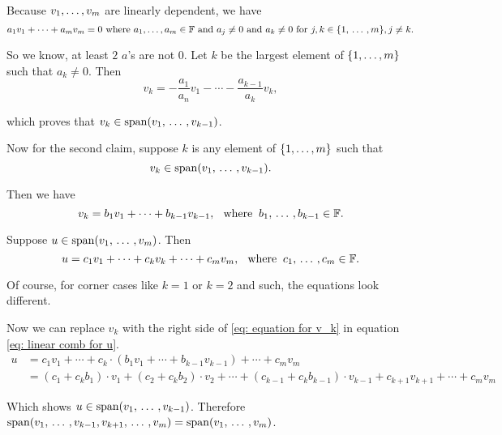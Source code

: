 \begin{prf}
  Because $v_1, \dots, v_m$ are linearly dependent, we have
  \begin{equation}
    a_1 v_1 + \cdots + a_m v_m = 0
    $ where $a_1, \ldots, a_m \in \myF$ and $a_j \neq 0$ and $a_k \neq 0 $ for $j,k \in \{1, \ddd, m\}, j \neq k.
  \end{equation}

  So we know, at least $2$ $a$'s are not $0$.
  Let $k$ be the largest element of $\{ 1, \ldots, m \}$ such that $a_k \neq 0$. Then
  \begin{equation}
    v_k = - \frac{a_1}{a_n}v_1 - \cdots - \frac{a_{k-1}}{a_k}v_k,
  \end{equation}

  which proves that $v_k \in \operatorname{span} (v_1, {\, \ldots \,\,}, v_{k-1})$.

  Now for the second claim, suppose $k$ is any element of $\{ 1, \ldots, m \}$ such that
  \begin{equation}
    v_k \in \operatorname{span} (v_1, {\, \ldots \,\,}, v_{k-1}).
  \end{equation}

  Then we have
  \begin{equation}
    \label{eq: equation for v_k}
    v_k = b_1v_1 + \cdots + b_{k-1}v_{k-1}, \;\;\, \text{where}\;\; b_1, {\, \ldots \,\,}, b_{k-1} \in \mathbb{F}.
  \end{equation}

  Suppose $u \in \operatorname{span} (v_1, {\, \ldots \,\,}, v_m)$. Then
  \begin{equation}
    \label{eq: linear comb for u}
    u = c_1v_1 + \cdots + c_kv_k + \cdots +c_{m}v_{m}, \;\;\, \text{where}\;\; c_1, {\, \ldots \,\,}, c_{m} \in \mathbb{F}.
  \end{equation}

  Of course, for corner cases like $k=1$ or $k=2$ and such, the equations look different.

  Now we can replace $v_k$ with the right side of \eqref{eq: equation for v_k} in equation \eqref{eq: linear comb for u}.
  \begin{equation}
    \begin{aligned}
      u
      & = c_1v_1 + \cdots + c_k \cdot (b_1v_1 + \cdots + b_{k-1}v_{k-1}) + \cdots +c_{m}v_{m} \\
      & = (c_1 + c_k b_1)\cdot v_1 + (c_2 + c_k b_2) \cdot v_2 + \cdots + (c_{k-1}+c_k b_{k-1}) \cdot v_{k-1} + c_{k+1} v_{k+1} + \cdots + c_m v_m
    \end{aligned}
  \end{equation}

  Which shows $u \in \operatorname{span} (v_1, {\, \ldots \,\,}, v_{k-1})$. Therefore $\operatorname{span} (v_1, {\, \ldots \,\,}, v_{k-1}, v_{k+1}, {\, \ldots \,\,}, v_m) = \operatorname{span} (v_1, {\, \ldots \,\,}, v_m)$.
\end{prf}

